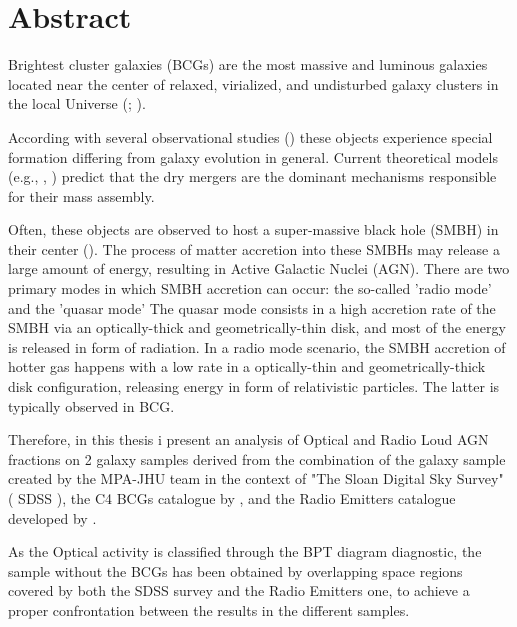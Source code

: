 \chapter*{Abstract}
Brightest cluster galaxies (BCGs) are the most massive and luminous galaxies located near the center of relaxed, virialized, and undisturbed galaxy clusters in the local Universe (\cite{1976ApJ...205..688S}; \cite{2010MNRAS.404.1231V}). 

According with several observational studies (\cite{2020MNRAS.498.2719T}) these objects experience special formation differing from galaxy evolution in general. Current theoretical models (e.g., \cite{2007MNRAS.375....2D}, \cite{2019ApJ...881..150C}) predict that the dry mergers are the dominant mechanisms responsible for their mass assembly.

Often, these objects are observed to host a super-massive black hole (SMBH) in their center (\cite{2006ApJ...652..216R}).  
The process of matter accretion into these SMBHs may release a large amount of energy, resulting in Active Galactic Nuclei (AGN).
There are two primary modes in which SMBH accretion can occur: the so-called 'radio mode' and the 'quasar mode'
The quasar mode consists in a high accretion rate of the SMBH via an optically-thick and geometrically-thin disk, and most of the energy is released in form of radiation. In a radio mode scenario, the SMBH accretion of hotter gas happens with a low rate in a optically-thin and geometrically-thick disk configuration, releasing energy in form of relativistic particles. The latter is typically observed in BCG. 


Therefore, in this thesis i present an analysis of Optical and Radio Loud AGN fractions on 2 galaxy samples derived from the combination of the galaxy sample created by the MPA-JHU team in the context of  "The Sloan Digital Sky Survey" ( SDSS ),  the C4 BCGs catalogue by \cite{2005AJ....130..968M}, and the Radio Emitters catalogue developed by \cite{2005MNRAS.362....9B}.

As the Optical activity is classified through the BPT diagram diagnostic, the sample without the BCGs has been obtained by overlapping space regions covered by both the SDSS survey and the Radio Emitters one, to achieve a proper confrontation between the results in the different samples.

